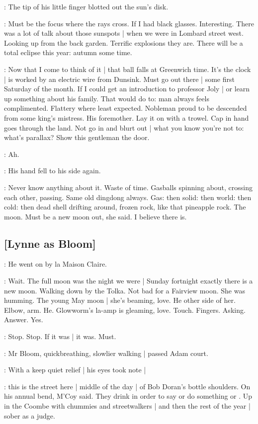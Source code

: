 :
The tip of his little finger blotted out the sun's disk.

\BloomInt:
Must be the focus where the rays cross.
If I had black glasses.
Interesting.
There was a lot of talk about those sunspots |
when we were in Lombard street west.
Looking up from the back garden.
Terrific explosions they are.
There will be a total eclipse this year:
autumn some time.

\BloomInt:
Now that I come to think of it |
that ball falls at Greenwich time.
It's the clock |
is worked by an electric wire from Dunsink.
Must go out there |
some first Saturday of the month.
If I could get an introduction to professor Joly |
or learn up something about his family.
That would do to:
man always feels complimented.
Flattery where least expected.
Nobleman proud to be descended from some king's mistress.
His foremother.
Lay it on with a trowel.
Cap in hand goes through the land.
Not go in and blurt out |
what you know you're not to:
what's parallax?
Show this gentleman the door.

\BloomInt:
Ah.

:
His hand fell to his side again.

\BloomInt:
Never know anything about it.
Waste of time.
Gasballs spinning about,
crossing each other,
passing.
Same old dingdong always.
Gas:
then solid:
then world:
then cold:
then dead shell drifting around,
frozen rock,
like that pineapple rock.
The moon.
Must be a new moon out,
she said.
I believe there is.

\subsection{[Lynne as Bloom]}

:
He went on by la Maison Claire.

\BloomInt:
Wait.
The full moon was the night we were |
Sunday fortnight exactly there is a new moon.
Walking down by the Tolka.
Not bad for a Fairview moon.
She was humming.
The young May moon |
she's beaming,
love.
He other side of her.
Elbow, arm.
He.
Glowworm's la-amp is gleaming, love.
Touch.
Fingers.
Asking.
Answer.
Yes.

\BloomInt:
Stop.
Stop.
If it was |
it was.
Must.

:
Mr Bloom,
quickbreathing,
slowlier walking |
passed Adam court.

:
With a keep quiet relief |
his eyes took note |

\BloomInt:
this is the street here |
middle of the day |
of Bob Doran's bottle shoulders.
On his annual bend,
M'Coy said.
They drink in order to say or do something
or .
Up in the Coombe with chummies and streetwalkers |
and then the rest of the year |
sober as a judge.


